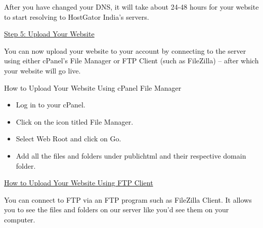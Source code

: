 \documentclass[12pt]{report}
\renewcommand{\_}{\kern-1.5pt\textunderscore\kern-1.5pt}
\begin{document}
 \tabto{0.59in} \textcolor[HTML]{0D0D0D}{After you have changed your DNS, it will take about 24-48 hours for your website to start resolving to HostGator India’s servers.}\par


\vspace{\baselineskip}\textcolor[HTML]{0D0D0D}{\uline{Step 5: Upload Your Website}}\par

\textcolor[HTML]{0D0D0D}{You can now upload your website to your account by connecting to the server using either cPanel’s File Manager or FTP Client (such as FileZilla) – after which your website will go live.}\par

\textcolor[HTML]{0D0D0D}{How to Upload Your Website Using cPanel File Manager}\par

\begin{itemize}
	\item \textcolor[HTML]{0D0D0D}{Log in to your cPanel.}\par

	\item \textcolor[HTML]{0D0D0D}{Click on the icon titled File Manager.}\par

	\item \textcolor[HTML]{0D0D0D}{Select Web Root and click on Go.}\par

	\item \textcolor[HTML]{0D0D0D}{Add all the files and folders under public\_html and their respective domain folder.}
\end{itemize}\par


\vspace{\baselineskip}\begin{adjustwidth}{1.18in}{0.0in}
\textcolor[HTML]{0D0D0D}{\uline{How to Upload Your Website Using FTP Client}}\par

\end{adjustwidth}

\begin{adjustwidth}{0.98in}{0.57in}
\textcolor[HTML]{0D0D0D}{You can connect to FTP via an FTP program such as FileZilla Client. It allows you to see the files and folders on our server like you’d see them on your computer.}\par

\end{adjustwidth}
\end{document}
